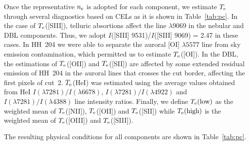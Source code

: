 \documentclass[twocolumn,linenumbers]{aastex63}
\begin{document}
Once the representative $n_{\rm e}$ is adopted for each component, we estimate $T_{\rm e}$ through several diagnostics based on CELs as it is shown in Table~\ref{tab:pc}. In the case of $T_{\rm e}$([S\thinspace III]), telluric absortions affect the line $\lambda 9069$ in the nebular and DBL components. Thus, we adopt $I$([S\thinspace III] 9531)/$I$([S\thinspace III] 9069) = 2.47 \citep{Podobedova09} in these cases. In HH~204 we were able to separate the auroral [O\thinspace I] $\lambda 5577$ line from sky emission contamination, which permitted us to estimate $T_{\rm e}$([O\thinspace I]). In the DBL, the estimations of $T_{\rm e}$([O\thinspace II]) and $T_{\rm e}$([S\thinspace II]) are affected by some extended residual emission of HH~204 in the auroral lines that crosses the cut border, affecting the first pixels of cut~2. $T_{\rm e}$(He\thinspace I) was estimated using the average values obtained from He\thinspace I  $I(\lambda7281)/I(\lambda6678 )$, $I(\lambda7281)/I(\lambda4922 )$ and $I(\lambda7281)/I(\lambda4388)$ line intensity ratios. Finally, we define $T_{\rm e} (\text{low})$ as the weighted mean of $T_{\rm e}$([N\thinspace II]), $T_{\rm e}$([O\thinspace II]) and $T_{\rm e}$([S\thinspace II]) while $T_{\rm e} (\text{high})$ is the weighted mean of $T_{\rm e}$([O\thinspace III]) and $T_{\rm e}$([S\thinspace III]).

The resulting physical conditions for all  components are shown in Table~\ref{tab:pc}.
\end{document}
